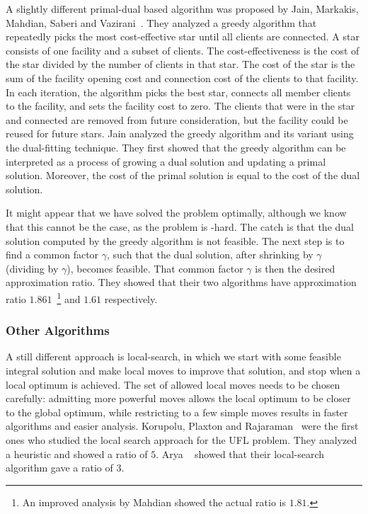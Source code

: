 \documentclass[oneside,final]{ucr}
\begin{document}
A slightly different primal-dual based algorithm was
proposed by Jain, Markakis, Mahdian, Saberi and
Vazirani~\cite{JainMMSV03}. They analyzed a greedy algorithm
that repeatedly picks the most cost-effective star until all
clients are connected. A star consists of one facility and a
subset of clients. The cost-effectiveness is the cost of the
star divided by the number of clients in that star. The cost
of the star is the sum of the facility opening cost and
connection cost of the clients to that facility. In each
iteration, the algorithm picks the best star, connects all
member clients to the facility, and sets the facility cost
to zero. The clients that were in the star and connected are
removed from future consideration, but the facility could be
reused for future stars. Jain {\etal} analyzed the greedy
algorithm and its variant using the dual-fitting
technique. They first showed that the greedy algorithm can
be interpreted as a process of growing a dual solution and
updating a primal solution. Moreover, the cost of the primal
solution is equal to the cost of the dual solution.

It might appear that we have solved the {\UFL} problem
optimally, although we know that this cannot be the case, as
the {\UFL} problem is {\NP}-hard. The catch is that the dual
solution computed by the greedy algorithm is not
feasible. The next step is to find a common factor $\gamma$,
such that the dual solution, after shrinking by $\gamma$
(dividing by $\gamma$), becomes feasible. That common factor
$\gamma$ is then the desired approximation ratio. They
showed that their two algorithms have approximation ratio
$1.861$~\footnote{An improved analysis by Mahdian showed the
  actual ratio is $1.81$.}  and $1.61$ respectively.

\subsubsection{Other Algorithms}
A still different approach is local-search, in which we
start with some feasible integral solution and make local
moves to improve that solution, and stop when a local
optimum is achieved. The set of allowed local moves needs to
be chosen carefully: admitting more powerful moves allows
the local optimum to be closer to the global optimum, while
restricting to a few simple moves results in faster
algorithms and easier analysis. Korupolu, Plaxton and
Rajaraman~\cite{KorupoluPR98} were the first ones who
studied the local search approach for the UFL problem. They
analyzed a heuristic and showed a ratio of $5$.  Arya
{\etal}~\cite{AryaGKMMP01} showed that their local-search
algorithm gave a ratio of $3$.
\end{document}
